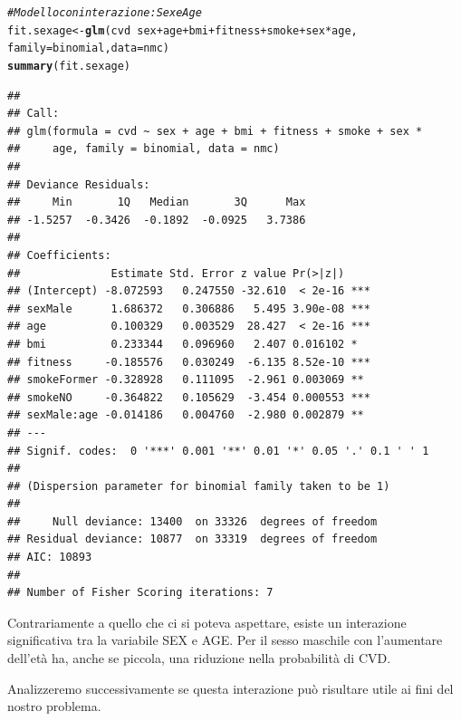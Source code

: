 \documentclass{article}\usepackage[]{graphicx}\usepackage[]{xcolor}
\makeatletter
\newcommand{\hlcom}[1]{\textcolor[rgb]{0.678,0.584,0.686}{\textit{#1}}}%
\newcommand{\hlopt}[1]{\textcolor[rgb]{0,0,0}{#1}}%
\newcommand{\hlstd}[1]{\textcolor[rgb]{0.345,0.345,0.345}{#1}}%
\newcommand{\hlkwb}[1]{\textcolor[rgb]{0.69,0.353,0.396}{#1}}%
\newcommand{\hlkwc}[1]{\textcolor[rgb]{0.333,0.667,0.333}{#1}}%
\newcommand{\hlkwd}[1]{\textcolor[rgb]{0.737,0.353,0.396}{\textbf{#1}}}%
\newenvironment{kframe}{%
 \def\at@end@of@kframe{}%
 \ifinner\ifhmode%
  \def\at@end@of@kframe{\end{minipage}}%
  \begin{minipage}{\columnwidth}%
 \fi\fi%
 \def\FrameCommand##1{\hskip\@totalleftmargin \hskip-\fboxsep
 \colorbox{shadecolor}{##1}\hskip-\fboxsep
     \hskip-\linewidth \hskip-\@totalleftmargin \hskip\columnwidth}%
 \MakeFramed {\advance\hsize-\width
   \@totalleftmargin\z@ \linewidth\hsize
   \@setminipage}}%
 {\par\unskip\endMakeFramed%
 \at@end@of@kframe}
\newenvironment{knitrout}{}{} %
\makeatother
\begin{document}
\begin{knitrout}
\color{fgcolor}\begin{kframe}
\begin{alltt}
\hlcom{#Modello con interazione: Sex e Age}
\hlstd{fit.sexage} \hlkwb{<-} \hlkwd{glm}\hlstd{(cvd}\hlopt{~}\hlstd{sex}\hlopt{+}\hlstd{age}\hlopt{+}\hlstd{bmi}\hlopt{+}\hlstd{fitness}\hlopt{+}\hlstd{smoke}\hlopt{+}\hlstd{sex}\hlopt{*}\hlstd{age,}
                  \hlkwc{family}\hlstd{=binomial,} \hlkwc{data}\hlstd{=nmc)}
\hlkwd{summary}\hlstd{(fit.sexage)}
\end{alltt}
\begin{verbatim}
## 
## Call:
## glm(formula = cvd ~ sex + age + bmi + fitness + smoke + sex * 
##     age, family = binomial, data = nmc)
## 
## Deviance Residuals: 
##     Min       1Q   Median       3Q      Max  
## -1.5257  -0.3426  -0.1892  -0.0925   3.7386  
## 
## Coefficients:
##              Estimate Std. Error z value Pr(>|z|)    
## (Intercept) -8.072593   0.247550 -32.610  < 2e-16 ***
## sexMale      1.686372   0.306886   5.495 3.90e-08 ***
## age          0.100329   0.003529  28.427  < 2e-16 ***
## bmi          0.233344   0.096960   2.407 0.016102 *  
## fitness     -0.185576   0.030249  -6.135 8.52e-10 ***
## smokeFormer -0.328928   0.111095  -2.961 0.003069 ** 
## smokeNO     -0.364822   0.105629  -3.454 0.000553 ***
## sexMale:age -0.014186   0.004760  -2.980 0.002879 ** 
## ---
## Signif. codes:  0 '***' 0.001 '**' 0.01 '*' 0.05 '.' 0.1 ' ' 1
## 
## (Dispersion parameter for binomial family taken to be 1)
## 
##     Null deviance: 13400  on 33326  degrees of freedom
## Residual deviance: 10877  on 33319  degrees of freedom
## AIC: 10893
## 
## Number of Fisher Scoring iterations: 7
\end{verbatim}
\end{kframe}
\end{knitrout}
    
    Contrariamente a quello che ci si poteva aspettare, esiste un interazione 
    significativa tra la variabile SEX e AGE. Per il sesso maschile con l'aumentare
    dell'età ha, anche se piccola, una riduzione nella probabilità di CVD. \par
    Analizzeremo successivamente se questa interazione può risultare utile ai fini
    del nostro problema.
  
  \clearpage
  
\end{document}
